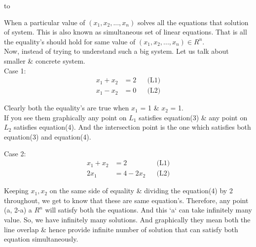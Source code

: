 to\documentclass{article}
\begin{document}
When a particular value of \((x_1, x_2, ..., x_n)\) solves all the equations that solution of system. This is also known as simultaneous set of linear equations. That is all the equality's
should hold for same value of \((x_1, x_2, ..., x_n) \in R^n\).\\

Now, instead of trying to understand such a big system. Let us talk about smaller \& concrete system.\\
Case 1:\\
\begin{align}
    x_1 + x_2 &= 2 &&  \text{(L1)}\\
    x_1 - x_2 &= 0 &&  \text{(L2)}
\end{align}

Clearly both the equality's are true when \(x_1\) = 1 \& \(x_2\) = 1.\\

If you see them graphically any point on \(L_1\) satisfies equation(3) \& any point on \(L_2\) satisfies equation(4). And the intersection point is the one which satisfies both equation(3) and equation(4).\\


Case 2:\\

\begin{align}
    x_1 + x_2 &= 2 &&  \text{(L1)}\\
    2x_1 &= 4 - 2x_2 &&  \text{(L2)}
\end{align}

Keeping $x_1, x_2$ on the same side of equality \& dividing the equation(4) by 2 throughout, we get to know that these are same equation's. Therefore, any point (a, 2-a) \forall a \in \(R^n\) will satisfy both the equations. And this `a` can take infinitely many value. So, we have infinitely many solutions. And graphically they mean both the line overlap \& hence provide infinite number of solution that can satisfy both equation simultaneously.\\
\end{document}

